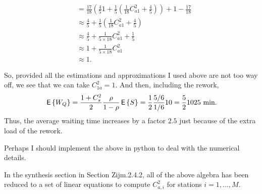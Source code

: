 \begin{question}
\begin{solution}
\begin{equation*}
\begin{split}
&= \frac{17}{18} \left(\frac 45 1 + \frac 1 5 \left(\frac{1}{18} C_{a1}^2 + \frac 45\right)\right) + 1 - \frac{17}{18}\\
&\approx \frac 45 + \frac 1 5 \left(\frac{1}{18} C_{a1}^2 + \frac 45\right) \\
&\approx \frac 45 + \frac{1}{5\times 18} C_{a1}^2 + \frac 15 \\
&\approx 1 + \frac{1}{5\times 18} C_{a1}^2 \\
&\approx 1.
  \end{split}
\end{equation*}

So, provided all the estimations and approximations I used above are
not too way off, we see that we can take $C_{1a}^2=1$. And then, including the rework,
  \begin{equation*}
    \,\mathsf{E}\left\{W_Q\right\} = \frac{1+C_s^2}2 \frac{\rho}{1-\rho} \,\mathsf{E}\left\{S\right\} = \frac 12 \frac{5/6}{1/6} 10 = \frac 52 10 25 \text{ min}.
  \end{equation*}
  Thus, the average waiting time increases by a factor $2.5$ just
  because of the extra load of the rework.  

  Perhaps I should implement the above in python to deal with the
  numerical details.

  In the synthesis section in Section Zijm.2.4.2, all of the above
  algebra has been reduced to a set of linear equations to compute
  $C_{a,i}^2$ for stations $i=1,\ldots,M$.
\end{solution}
\end{question}




